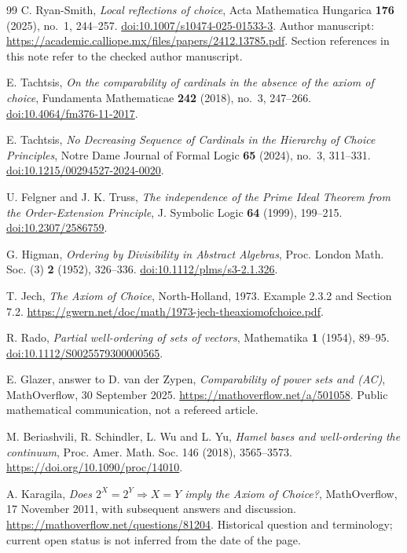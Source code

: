 \begin{thebibliography}{99}
 C. Ryan-Smith, \emph{Local reflections of choice}, Acta Mathematica Hungarica \textbf{176} (2025), no.~1, 244--257. \href{https://doi.org/10.1007/s10474-025-01533-3}{doi:10.1007/s10474-025-01533-3}. Author manuscript: \url{https://academic.calliope.mx/files/papers/2412.13785.pdf}. Section references in this note refer to the checked author manuscript.

 E. Tachtsis, \emph{On the comparability of cardinals in the absence of the axiom of choice}, Fundamenta Mathematicae \textbf{242} (2018), no.~3, 247--266. \href{https://doi.org/10.4064/fm376-11-2017}{doi:10.4064/fm376-11-2017}.

 E. Tachtsis, \emph{No Decreasing Sequence of Cardinals in the Hierarchy of Choice Principles}, Notre Dame Journal of Formal Logic \textbf{65} (2024), no.~3, 311--331. \href{https://doi.org/10.1215/00294527-2024-0020}{doi:10.1215/00294527-2024-0020}.

 U. Felgner and J. K. Truss, \emph{The independence of the Prime Ideal Theorem from the Order-Extension Principle}, J. Symbolic Logic \textbf{64} (1999), 199--215. \href{https://doi.org/10.2307/2586759}{doi:10.2307/2586759}.

 G. Higman, \emph{Ordering by Divisibility in Abstract Algebras}, Proc. London Math. Soc. (3) \textbf{2} (1952), 326--336. \href{https://doi.org/10.1112/plms/s3-2.1.326}{doi:10.1112/plms/s3-2.1.326}.

 T. Jech, \emph{The Axiom of Choice}, North-Holland, 1973. Example 2.3.2 and Section 7.2. \url{https://gwern.net/doc/math/1973-jech-theaxiomofchoice.pdf}.

 R. Rado, \emph{Partial well-ordering of sets of vectors}, Mathematika \textbf{1} (1954), 89--95. \href{https://doi.org/10.1112/S0025579300000565}{doi:10.1112/S0025579300000565}.

 E. Glazer, answer to D. van der Zypen, \emph{Comparability of power sets and (AC)}, MathOverflow, 30 September 2025. \url{https://mathoverflow.net/a/501058}. Public mathematical communication, not a refereed article.

 M. Beriashvili, R. Schindler, L. Wu and L. Yu, \emph{Hamel bases and well-ordering the continuum}, Proc. Amer. Math. Soc. 146 (2018), 3565--3573. \url{https://doi.org/10.1090/proc/14010}.

 A. Karagila, \emph{Does $2^X=2^Y\Rightarrow X=Y$ imply the Axiom of Choice?}, MathOverflow, 17 November 2011, with subsequent answers and discussion. \url{https://mathoverflow.net/questions/81204}. Historical question and terminology; current open status is not inferred from the date of the page.


\end{thebibliography}

